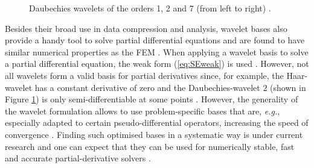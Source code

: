 {\begin{figure}
\begin{subfigure}{0.32\textwidth}
   \end{subfigure}
   \caption{Daubechies wavelets of the orders 1, 2 and 7 (from left to right) \cite{daubechies}.}
   \label{fig:wavelets}
\end{figure}

Besides their broad use in data compression and analysis, wavelet bases also provide a handy tool to solve partial differential equations and are found to have similar numerical properties as the FEM \cite{FdFeWavelet,CoulWavelet}.
When applying a wavelet basis to solve a partial differential equation, the weak form (\ref{eq:SEweak}) is used \cite{dahlke}.
However, not all wavelets form a valid basis for partial derivatives since, for example, the Haar-wavelet has a constant derivative of zero and the Daubechies-wavelet $2$ (shown in Figure \ref{fig:wavelets}) is only semi-differentiable at some points \cite{WaveletChem}.
However, the generality of the wavelet formulation allows to use problem-specific bases that are, \textit{e.g.}, especially adapted to certain pseudo-differential operators, increasing the speed of convergence \cite{dahlke}.
Finding such optimised bases in a systematic way is under current research and one can expect that they can be used for numerically stable, fast and accurate partial-derivative solvers \cite{dahlke,kunoth}.

}
